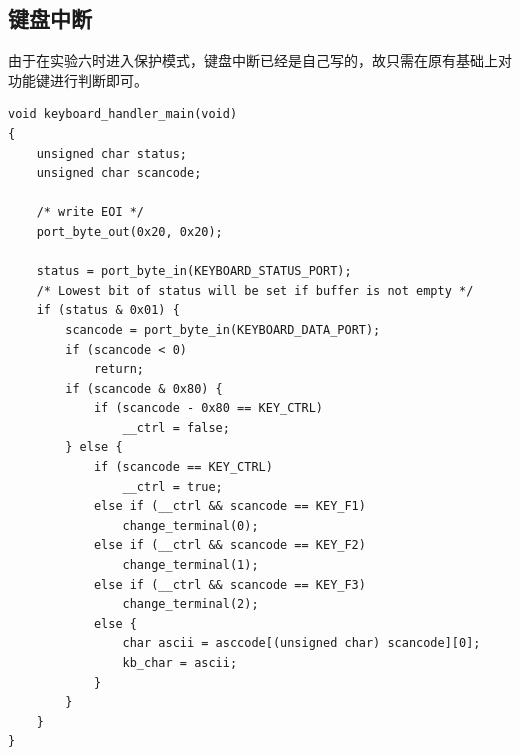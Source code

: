 \documentclass[logo,reportComp]{thesis}
\begin{document}
\subsection{键盘中断}
由于在实验六时进入保护模式，键盘中断已经是自己写的，故只需在原有基础上对功能键进行判断即可。
\begin{lstlisting}
void keyboard_handler_main(void)
{
	unsigned char status;
	unsigned char scancode;

	/* write EOI */
	port_byte_out(0x20, 0x20);

	status = port_byte_in(KEYBOARD_STATUS_PORT);
	/* Lowest bit of status will be set if buffer is not empty */
	if (status & 0x01) {
		scancode = port_byte_in(KEYBOARD_DATA_PORT);
		if (scancode < 0)
			return;
		if (scancode & 0x80) {
			if (scancode - 0x80 == KEY_CTRL)
				__ctrl = false;
		} else {
			if (scancode == KEY_CTRL)
				__ctrl = true;
			else if (__ctrl && scancode == KEY_F1)
				change_terminal(0);
			else if (__ctrl && scancode == KEY_F2)
				change_terminal(1);
			else if (__ctrl && scancode == KEY_F3)
				change_terminal(2);
			else {
				char ascii = asccode[(unsigned char) scancode][0];
				kb_char = ascii;
			}
		}
	}
}
\end{lstlisting}
\end{document}
